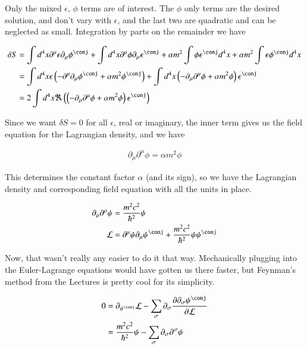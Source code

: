 \documentclass{article}
\begin{document}
Only the mixed $\epsilon$, $\phi$ terms are of interest.  The $\phi$ only terms are the desired solution, and don't vary with $\epsilon$, and the last two are
quadratic and can be neglected as small.  Integration by parts on the remainder we have

\begin{align*}
\delta S
&=
\int d^4 x \partial^\mu \epsilon \partial_\mu \phi^\conj 
+ \int d^4 x \partial^\mu \phi \partial_\mu \epsilon^\conj  
+ \alpha m^2 \int \phi \epsilon^\conj  d^4 x
+ \alpha m^2 \int \epsilon \phi^\conj  d^4 x \\
&=
\int d^4 x \epsilon \left( -\partial^\mu \partial_\mu \phi^\conj + \alpha m^2 \phi^\conj \right)
+ \int d^4 x \left( -\partial_\mu \partial^\mu \phi + \alpha m^2 \phi \right) \epsilon^\conj  
\\
&=
2 \int d^4 x \Re \left( \left( -\partial_\mu \partial^\mu \phi + \alpha m^2 \phi \right) \epsilon^\conj  \right) \\
\end{align*}

Since we want $\delta S = 0$ for all $\epsilon$, real or imaginary, the inner term gives us the field equation for the Lagrangian density, and we have

\begin{align*}
\partial_\mu \partial^\mu \phi = \alpha m^2 \phi 
\end{align*}

This determines the constant factor $\alpha$ (and its sign), so we have the Lagrangian density and corresponding field equation 
with all the units in place.

\begin{align}\label{eqn:withConstant}
\partial_\mu \partial^\mu \psi &= \frac{m^2 c^2}{\hbar^2} \psi \\
\LL &= \partial^\mu \psi \partial_\mu \psi^\conj + \frac{m^2 c^2}{\hbar^2}\psi \psi^\conj
\end{align}

Now, that wasn't really any easier to do it that way.  Mechanically plugging into the Euler-Lagrange equations would have gotten us there
faster, but Feynman's method from the Lectures 
\cite{feynman1963flp}
is pretty cool for its simplicity.

\begin{align*}
0 
&= \partial_{\psi^\conj}\LL - \sum_\sigma \partial_\sigma \PD{\partial_\sigma \psi^\conj}{\LL} \\
&= \frac{m^2 c^2}{\hbar^2}\psi - \sum_\sigma \partial_\sigma \partial^\sigma \psi 
\end{align*}
\end{document}
